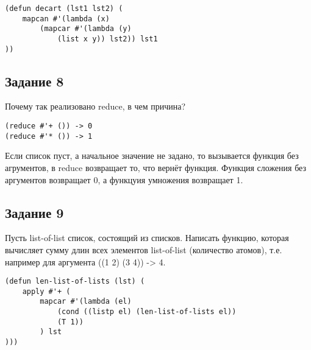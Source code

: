 \begin{lstlisting}
(defun decart (lst1 lst2) (
    mapcan #'(lambda (x)
        (mapcar #'(lambda (y)
            (list x y)) lst2)) lst1
))
\end{lstlisting}

\subsection*{Задание 8}

Почему так реализовано reduce, в чем причина?

\begin{lstlisting}
(reduce #'+ ()) -> 0
(reduce #'* ()) -> 1
\end{lstlisting}

Если список пуст, а начальное значение не задано, то вызывается функция без агрументов, в reduce возвращает то, что вернёт функция. Функция сложения без аргументов возвращает 0, а функцуия умножения возвращает 1.


\subsection*{Задание 9}

Пусть list-of-list список, состоящий из списков. Написать функцию, которая
вычисляет сумму длин всех элементов list-of-list (количество атомов), т.е. например
для аргумента
 ((1 2) (3 4)) -> 4.

\begin{lstlisting}
(defun len-list-of-lists (lst) (
    apply #'+ (
        mapcar #'(lambda (el)
            (cond ((listp el) (len-list-of-lists el))
            (T 1))
        ) lst
)))
\end{lstlisting}